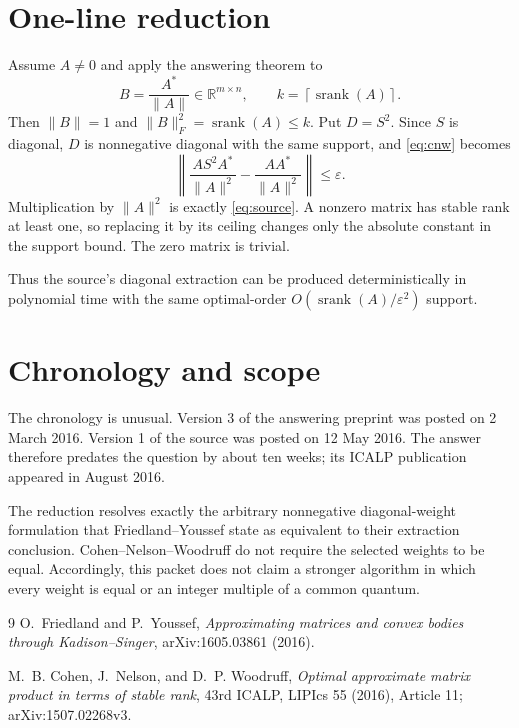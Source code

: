 \documentclass[11pt]{article}
\newcommand{\R}{\mathbb R}
\begin{document}
\section{One-line reduction}

Assume $A\ne0$ and apply the answering theorem to
\[
 B=\frac{A^*}{\|A\|}\in\R^{m\times n},
 \qquad
 k=\left\lceil\operatorname{srank}(A)\right\rceil.
\]
Then $\|B\|=1$ and
$\|B\|_F^2=\operatorname{srank}(A)\le k$.  Put $D=S^2$.
Since $S$ is diagonal, $D$ is nonnegative diagonal with the same support,
and \eqref{eq:cnw} becomes
\[
 \left\|
 \frac{AS^2A^*}{\|A\|^2}-
 \frac{AA^*}{\|A\|^2}
 \right\|\le\varepsilon.
\]
Multiplication by $\|A\|^2$ is exactly \eqref{eq:source}.  A nonzero matrix
has stable rank at least one, so replacing it by its ceiling changes only the
absolute constant in the support bound.  The zero matrix is trivial.

Thus the source's diagonal extraction can be produced deterministically in
polynomial time with the same optimal-order
$O(\operatorname{srank}(A)/\varepsilon^2)$ support.

\section{Chronology and scope}

The chronology is unusual.  Version 3 of the answering preprint was posted
on 2 March 2016.  Version 1 of the source was posted on 12 May 2016.  The
answer therefore predates the question by about ten weeks; its ICALP
publication appeared in August 2016.

The reduction resolves exactly the arbitrary nonnegative diagonal-weight
formulation that Friedland--Youssef state as equivalent to their extraction
conclusion.  Cohen--Nelson--Woodruff do not require the selected weights to
be equal.  Accordingly, this packet does not claim a stronger algorithm in
which every weight is equal or an integer multiple of a common quantum.

\begin{thebibliography}{9}
O.~Friedland and P.~Youssef,
\emph{Approximating matrices and convex bodies through Kadison--Singer},
arXiv:1605.03861 (2016).

M.~B. Cohen, J.~Nelson, and D.~P. Woodruff,
\emph{Optimal approximate matrix product in terms of stable rank},
43rd ICALP, LIPIcs 55 (2016), Article 11;
arXiv:1507.02268v3.
\end{thebibliography}
\end{document}
